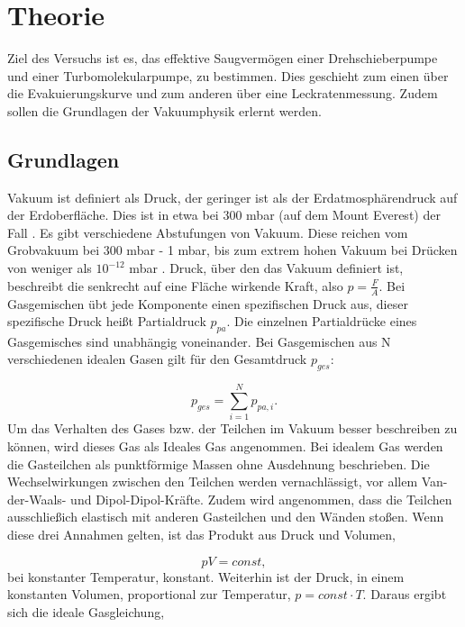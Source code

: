 \section{Theorie}
\label{sec:Theorie}
Ziel des Versuchs ist es, das effektive Saugvermögen einer Drehschieberpumpe und einer Turbomolekularpumpe, zu bestimmen.
Dies geschieht zum einen über die Evakuierungskurve und zum anderen über eine Leckratenmessung.
Zudem sollen die Grundlagen der Vakuumphysik erlernt werden.


\subsection{Grundlagen}
\label{sec:Grundlagen}
Vakuum ist definiert als Druck, der geringer ist als der Erdatmosphärendruck auf der Erdoberfläche.
Dies ist in etwa bei 300 mbar (auf dem Mount Everest) der Fall \cite{Pfeiffer, S.9}.
Es gibt verschiedene Abstufungen von Vakuum. Diese reichen vom Grobvakuum bei 300 mbar - 1 mbar, bis zum 
extrem hohen Vakuum bei Drücken von weniger als $10^{-12}$ mbar \cite{Pfeiffer, S.10}.
Druck, über den das Vakuum definiert ist, beschreibt die senkrecht auf eine Fläche wirkende Kraft, also $p = \frac{F}{A}$.
Bei Gasgemischen übt jede Komponente einen spezifischen Druck aus, dieser spezifische Druck heißt Partialdruck $p_{pa}$.
Die einzelnen Partialdrücke eines Gasgemisches sind unabhängig voneinander. 
Bei Gasgemischen aus N verschiedenen idealen Gasen gilt für den Gesamtdruck $p_{ges}$:

    \begin{equation}
        p_{ges} = \sum_{i=1}^{N} p_{pa,i}.
    \end{equation}
Um das Verhalten des Gases bzw. der Teilchen im Vakuum besser beschreiben zu können, wird dieses Gas als Ideales Gas angenommen.
Bei idealem Gas werden die Gasteilchen als punktförmige Massen ohne Ausdehnung beschrieben. 
Die Wechselwirkungen zwischen den Teilchen werden vernachlässigt, vor allem Van-der-Waals- und Dipol-Dipol-Kräfte.
Zudem wird angenommen, dass die Teilchen ausschließich elastisch mit anderen Gasteilchen und den Wänden stoßen.
Wenn diese drei Annahmen gelten, ist das Produkt aus Druck und Volumen, 

    \begin{equation}
    \label{equ:0}
        pV = const, 
    \end{equation}
bei konstanter Temperatur, konstant. 
Weiterhin ist der Druck, in einem konstanten Volumen, proportional zur Temperatur, $p = const \cdot T$.
Daraus ergibt sich die ideale Gasgleichung,

